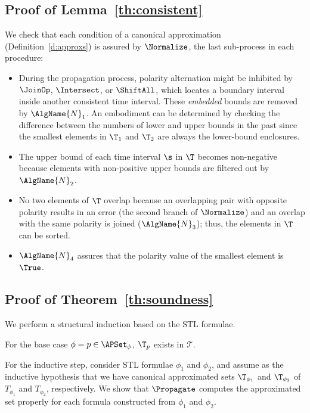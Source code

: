 \documentclass[paper]{ieice}
\begin{document}
\subsection{Proof of Lemma~\ref{th:consistent}}
\label{s:canonical:proof}

We check that each condition of a canonical approximation (Definition~\ref{d:approxs}) is assured by $\Normalize$, the last sub-process in each procedure:
\begin{itemize}
\item During the propagation process, polarity alternation might be inhibited by $\JoinOp$, $\Intersect$, or $\ShiftAll$, which locates a boundary interval inside another consistent time interval.
These \emph{embedded} bounds are removed by $\AlgName{N}_1$.
An embodiment can be determined by checking the difference between the numbers of lower and upper bounds in the past since the smallest elements in $\T_1$ and $\T_2$ are always the lower-bound enclosures.
\item The upper bound of each time interval $\s$ in $\T$ becomes non-negative because elements with non-positive upper bounds are filtered out by $\AlgName{N}_2$.
\item No two elements of $\T$ overlap because an overlapping pair with opposite polarity results in an error (the second branch of $\Normalize$) and an overlap with the same polarity is joined ($\AlgName{N}_3$);
thus, the elements in $\T$ can be sorted.
\item $\AlgName{N}_4$ assures that the polarity value of the smallest element is $\True$.
\Qed
\end{itemize}


\subsection{Proof of Theorem~\ref{th:soundness}}
\label{s:soundness:proof}

We perform a structural induction based on the STL formulae.

For the base case $\phi = p \in \APSet_{\phi}$, $\T_p$ exists in $\mathcal{T}$.

For the inductive step, consider STL formulae $\phi_1$ and $\phi_2$, and assume as the inductive hypothesis that we have canonical approximated sets $\T_{\phi_1}$ and $\T_{\phi_2}$ of $T_{\phi_1}$ and $T_{\phi_2}$, respectively.
We show that $\Propagate$ computes the approximated set properly for each formula constructed from $\phi_1$ and $\phi_2$.
\end{document}
